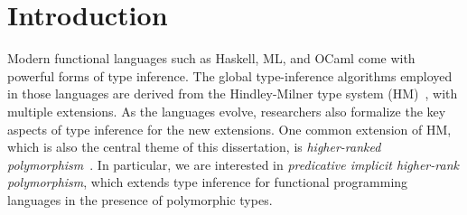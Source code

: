 \chapter{Introduction}


Modern functional languages such as Haskell, ML, and OCaml come with powerful
forms of type inference. The global type-inference algorithms employed in those
languages are derived from the Hindley-Milner type system (HM)~\citep{hindley,
  Damas:Milner}, with multiple extensions. As the languages evolve, researchers
also formalize the key aspects of type inference for the new extensions. One
common extension of HM, which is also the central theme of this dissertation, is
\emph{higher-ranked polymorphism}~\citep{odersky:putting,practical:inference,
  DK}. In particular, we are interested in \textit{predicative implicit
  higher-rank polymorphism}, which extends type inference for functional
programming languages in the presence of polymorphic types.






\noindent\makebox[\linewidth]{\rule{0.7\textwidth}{0.4pt}}

\vspace{1.5\baselineskip}




